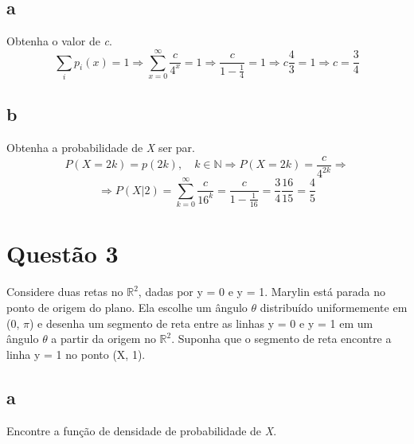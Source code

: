 \documentclass{article}[twocolumn]
\begin{document}
	\subsection{a}
	Obtenha o valor de \textit{c}.
	\begin{equation}
		\sum_{i}p_{i}(x) = 1 \Rightarrow \sum_{x = 0}^{\infty} \frac{c}{4^{x}} = 1 \Rightarrow
		\frac{c}{1 - \frac{1}{4}} = 1 \Rightarrow c\frac{4}{3} = 1 \Rightarrow c = \frac{3}{4}
		\nonumber
	\end{equation}
	\subsection{b}
	Obtenha a probabilidade de \textit{X} ser par.
	\begin{equation}
		P(X = 2k) = p(2k), \quad k \in \mathbb{N} \Rightarrow P(X = 2k) =
		\frac{c}{4^{2k}} \Rightarrow
		\nonumber
	\end{equation}
	\begin{equation}
		\Rightarrow
		P(X|2) = \sum_{k = 0}^{\infty} \frac{c}{16^k} = \frac{c}{1 - \frac{1}{16}} =
		\frac{3}{4}\frac{16}{15} = \frac{4}{5}
		\nonumber
	\end{equation}
	\newpage
	\section{Quest\~ao 3}
	Considere duas retas no $\mathbb{R}^{2}$, dadas por y = 0 e y = 1. Marylin
	est\'a parada no ponto de origem do plano. Ela escolhe um \^angulo $\theta$ distribu\'ido
	uniformemente em (0, $\pi$) e desenha um segmento de reta entre as linhas y = 0 e y = 1
	em um \^angulo $\theta$ a partir da origem no $\mathbb{R}^{2}$. Suponha que o segmento
	de reta encontre a linha y = 1 no ponto (X, 1).
	\begin{center}
	\end{center}
	\subsection{a}
	Encontre a fun\c{c}\~ao de densidade de probabilidade de \textit{X}.
\end{document}
